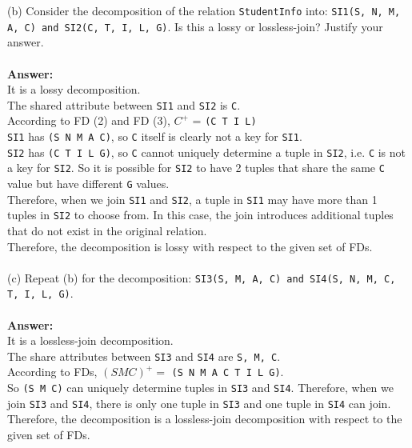 \documentclass{article}
\begin{document}
\noindent (b) Consider the decomposition of the relation \texttt{StudentInfo} into: \texttt{SI1(S, N, M, A, C) and SI2(C, T, I, L, G)}. Is this a lossy or lossless-join? Justify your answer.\\
\\
\textbf{Answer:}\\
It is a lossy decomposition.\\
The shared attribute between \texttt{SI1} and \texttt{SI2} is \texttt{C}. \\
According to FD (2) and FD (3), \(C^{+}\) = \texttt{(C T I L)} \\
\texttt{SI1} has \texttt{(S N M A C)}, so \texttt{C} itself is clearly not a key for \texttt{SI1}.\\
\texttt{SI2} has \texttt{(C T I L G)}, so \texttt{C} cannot uniquely determine a tuple in \texttt{SI2}, i.e. \texttt{C} is not a key for \texttt{SI2}. So it is possible for \texttt{SI2} to have 2 tuples that share the same \texttt{C} value but have different \texttt{G} values.\\
Therefore, when we join \texttt{SI1} and \texttt{SI2}, a tuple in \texttt{SI1} may have more than 1 tuples in \texttt{SI2} to choose from. In this case, the join introduces additional tuples that do not exist in the original relation.\\
Therefore, the decomposition is lossy with respect to the given set of FDs.\\
\\
\noindent (c) Repeat (b) for the decomposition: \texttt{SI3(S, M, A, C) and SI4(S, N, M, C, T, I, L, G)}. \\
\\
\textbf{Answer:}\\
It is a lossless-join decomposition.\\
The share attributes between \texttt{SI3} and \texttt{SI4} are \texttt{S, M, C}.\\
According to FDs, \( (S M C)^+ = \) \texttt{(S N M A C T I L G)}. \\
So \texttt{(S M C)} can uniquely determine tuples in \texttt{SI3} and \texttt{SI4}. Therefore, when we join \texttt{SI3} and \texttt{SI4}, there is only one tuple in \texttt{SI3} and one tuple in \texttt{SI4} can join. \\
Therefore, the decomposition is a lossless-join decomposition with respect to the given set of FDs.
\end{document}
